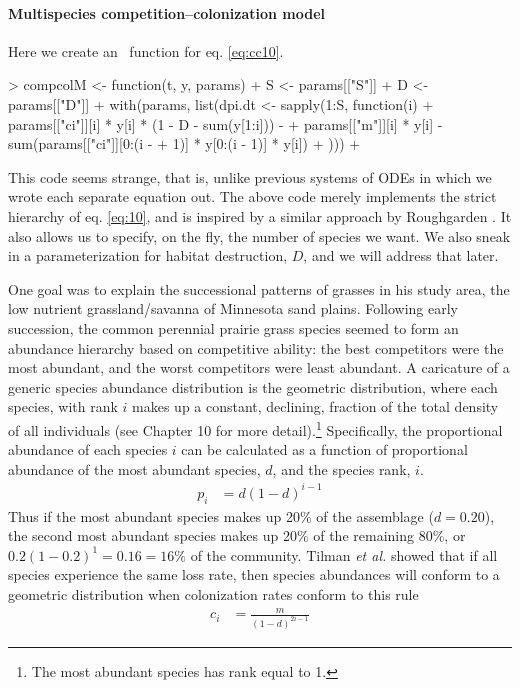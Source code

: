 \medskip \noindent
\begin{boxedminipage}{\linewidth}
  {\footnotesize
\paragraph{Multispecies competition--colonization model} 
Here we create an \R~function for eq. \ref{eq:cc10}.
\begin{Schunk}
\begin{Sinput}
> compcolM <- function(t, y, params) {
+     S <- params[["S"]]
+     D <- params[["D"]]
+     with(params, list(dpi.dt <- sapply(1:S, function(i) {
+         params[["ci"]][i] * y[i] * (1 - D - sum(y[1:i])) - 
+             params[["m"]][i] * y[i] - sum(params[["ci"]][0:(i - 
+             1)] * y[0:(i - 1)] * y[i])
+     })))
+ }
\end{Sinput}
\end{Schunk}
This code seems strange, that is, unlike previous systems of ODEs in
which we wrote each separate equation out. The above code merely
implements the strict hierarchy of eq. \ref{eq:10}, and is inspired by a
similar approach by Roughgarden \cite{Roughgarden1998}. It also allows us to specify, on the fly, the number of species  we want. We also sneak in a parameterization for habitat destruction, $D$, and we will address that later. 
}
\end{boxedminipage} \medskip

One goal was to explain the successional patterns of grasses in his study area, the low nutrient grassland/savanna of Minnesota sand plains. Following early succession, the common perennial prairie grass species seemed to form an abundance hierarchy based on competitive ability: the best competitors were the most abundant, and the worst competitors were least abundant. A caricature of a generic species abundance distribution is the geometric distribution, where each species, with rank $i$ makes up a constant, declining, fraction of the total density of all individuals (see Chapter 10 for more detail).\footnote{The most abundant species has rank equal to 1.} Specifically, the proportional abundance of each species $i$ can be calculated as a function of proportional abundance of the most abundant species, $d$, and the species rank, $i$.
\begin{align}
  \label{eq:cc11}
  p_i&=d(1-d)^{i-1}
\end{align}
Thus if the most abundant species makes up 20\% of the assemblage ($d=0.20$), the second most abundant species makes up 20\% of the remaining 80\%, or $0.2(1-0.2)^1=0.16=16\%$ of the community. Tilman \emph{et al.} \cite{Tilman1994} showed that if all species experience the same loss rate, then species abundances will conform to a geometric distribution when colonization rates conform to this rule
\begin{align}
  \label{eq:col}
  c_i&=\frac{m}{\left(1-d\right)^{2i-1}}
\end{align}

